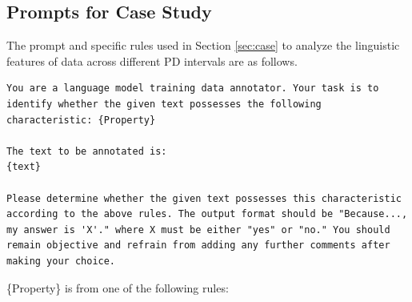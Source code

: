 \documentclass[11pt]{article}
\begin{document}
\subsection{Prompts for Case Study}
\label{sec:prompt}
The prompt and specific rules used in Section \ref{sec:case} to analyze the linguistic features of data across different PD intervals are as follows.
\begin{tcolorbox}[colback=white!95!gray,colframe=gray!50!black,rounded corners,label={prompt-dot}, title={Prompts for Property Recognition}]
\begin{lstlisting}[breaklines=true, xleftmargin=0pt, breakindent=0pt, columns=fullflexible, mathescape, numbers=none]
You are a language model training data annotator. Your task is to identify whether the given text possesses the following characteristic: {Property}

The text to be annotated is:
{text}

Please determine whether the given text possesses this characteristic according to the above rules. The output format should be "Because..., my answer is 'X'." where X must be either "yes" or "no." You should remain objective and refrain from adding any further comments after making your choice.
\end{lstlisting}
\end{tcolorbox}
\{Property\} is from one of the following rules:
\end{document}
